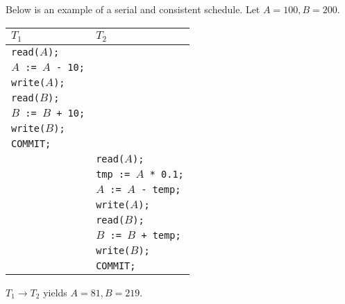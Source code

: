 \documentclass{report}
\newenvironment{example}{\begin{tcolorbox}[title={Example},colback=green!5!white,colframe=black!75!green]}{\end{tcolorbox}}
\renewcommand{\tt}[1]{\texttt{{#1}}}
\begin{document}
\begin{example}
    Below is an example of a serial and consistent schedule. Let
    $A = 100, B = 200$.

    {
        \centering
        \begin{tabular}{l|l}
            $T_1$ & $T_2$ \\
            \hline
            \tt{read($A$);} & \\
            \tt{$A$ := $A$ - 10;} & \\
            \tt{write($A$);} & \\
            \tt{read($B$);} & \\
            \tt{$B$ := $B$ + 10;} & \\
            \tt{write($B$);} & \\
            \tt{COMMIT;} & \\
                         & \tt{read($A$);} \\
                         & \tt{tmp := $A$ * 0.1;} \\
                         & \tt{$A$ := $A$ - temp;} \\
                         & \tt{write($A$);} \\
                         & \tt{read($B$);} \\
                         & \tt{$B$ := $B$ + temp;} \\
                         & \tt{write($B$);} \\
                         & \tt{COMMIT;} \\
        \end{tabular}
        \par
    }
    $T_1 \to T_2$ yields $A = 81, B = 219$.


\end{example}
\end{document}
